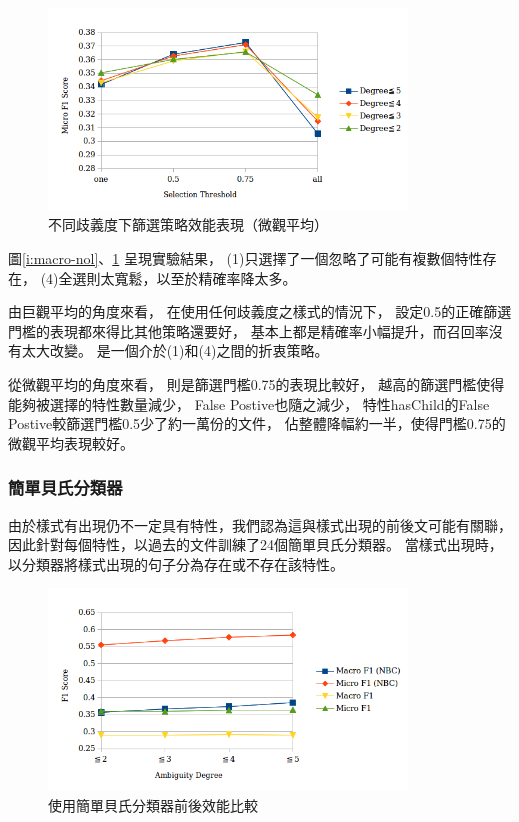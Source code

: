 \begin{figure}[h]
    \centering
    \includegraphics[width=0.85\textwidth]{images/04-micro-nol}
    \caption{不同歧義度下篩選策略效能表現（微觀平均）}
    \label{i:micro-nol}
\end{figure}

圖\ref{i:macro-nol}、\ref{i:micro-nol} 呈現實驗結果，
(1)只選擇了一個忽略了可能有複數個特性存在，
(4)全選則太寬鬆，以至於精確率降太多。

由巨觀平均的角度來看，
在使用任何歧義度之樣式的情況下，
設定0.5的正確篩選門檻的表現都來得比其他策略還要好，
基本上都是精確率小幅提升，而召回率沒有太大改變。
是一個介於(1)和(4)之間的折衷策略。

從微觀平均的角度來看，
則是篩選門檻0.75的表現比較好，
越高的篩選門檻使得能夠被選擇的特性數量減少，
False Postive也隨之減少，
特性hasChild的False Postive較篩選門檻0.5少了約一萬份的文件，
佔整體降幅約一半，使得門檻0.75的微觀平均表現較好。

\subsubsection{簡單貝氏分類器}
由於樣式有出現仍不一定具有特性，我們認為這與樣式出現的前後文可能有關聯，
因此針對每個特性，以過去的文件訓練了24個簡單貝氏分類器。
當樣式出現時，以分類器將樣式出現的句子分為存在或不存在該特性。

\begin{figure}[h]
    \centering
    \includegraphics[width=0.85\textwidth]{images/04-nbc}
    \caption{使用簡單貝氏分類器前後效能比較}
    \label{i:nbc}
\end{figure}

